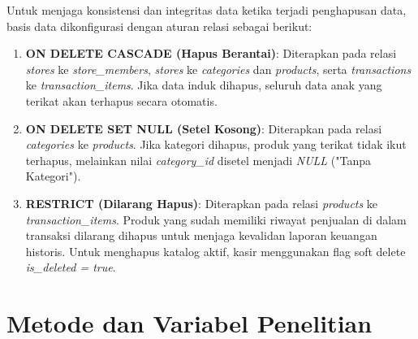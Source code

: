 Untuk menjaga konsistensi dan integritas data ketika terjadi penghapusan data, basis data dikonfigurasi dengan aturan relasi sebagai berikut:
\begin{enumerate}
    \item \textbf{ON DELETE CASCADE (Hapus Berantai)}: Diterapkan pada relasi \textit{stores} ke \textit{store\_members}, \textit{stores} ke \textit{categories} dan \textit{products}, serta \textit{transactions} ke \textit{transaction\_items}. Jika data induk dihapus, seluruh data anak yang terikat akan terhapus secara otomatis.
    \item \textbf{ON DELETE SET NULL (Setel Kosong)}: Diterapkan pada relasi \textit{categories} ke \textit{products}. Jika kategori dihapus, produk yang terikat tidak ikut terhapus, melainkan nilai \textit{category\_id} disetel menjadi \textit{NULL} ("Tanpa Kategori").
    \item \textbf{RESTRICT (Dilarang Hapus)}: Diterapkan pada relasi \textit{products} ke \textit{transaction\_items}. Produk yang sudah memiliki riwayat penjualan di dalam transaksi dilarang dihapus untuk menjaga kevalidan laporan keuangan historis. Untuk menghapus katalog aktif, kasir menggunakan flag soft delete \textit{is\_deleted = true}.
\end{enumerate}


\section{Metode dan Variabel Penelitian}

